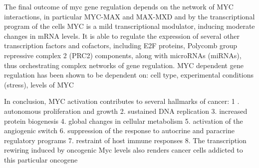 The final outcome of myc gene regulation depends on the network of MYC interactions, in particular MYC-MAX
and MAX-MXD and by the transcriptional program of the cells
MYC is a mild transcriptional modulator, inducing moderate changes in mRNA levels.
It is able to regulate the expression of several other transcription factors and cofactors, including E2F proteins,
Polycomb group repressive complex 2 (PRC2) components, along with microRNAs (miRNAs), thus orchestrating
complex networks of gene regulation.
MYC dependent gene regulation has been shown to be dependent on: cell type, experimental conditions (stress),
levels of MYC

In conclusion, MYC activation contributes to several hallmarks of cancer:
1 . autonomous proliferation and growth
2. sustained DNA replication
3. increased protein biogenesis
4. global changes in cellular metabolism
5. activation of the angiogenic switch
6. suppression of the response to autocrine and paracrine regulatory programs
7. restraint of host immune responses
8. The transcription rewiring induced by oncogenic Myc levels also renders cancer cells addicted to this particular oncogene
